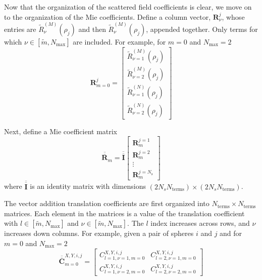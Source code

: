 Now that the organization of the scattered field coefficients is clear, we move on to the organization of the Mie coefficients. Define a column vector, $\boldsymbol{R}^{j}_{\nu}$, whose entries are $\widetilde{R}^{(M)}_{\nu}(\rho_{j})$ and then $\widetilde{R}^{(M)}_{\nu}(\rho_{j})$, appended together. Only terms for which $\nu \in [\widetilde{m}, N_{\mathrm{max}}]$ are included. For example, for $m=0$ and $N_{\mathrm{max}}=2$
\begin{equation}
\boldsymbol{R}^{j}_{m=0} = \left[ \begin{array}{c}
\widetilde{R}^{(M)}_{\nu=1}(\rho_{j}) \\
\widetilde{R}^{(M)}_{\nu=2}(\rho_{j}) \\ \hline
\widetilde{R}^{(N)}_{\nu=1}(\rho_{j}) \\
\widetilde{R}^{(N)}_{\nu=2}(\rho_{j})
\end{array}\right]
\end{equation}

Next, define a Mie coefficient matrix
\begin{equation}
\overline{\overline{\boldsymbol{R}}}_{m} =\overline{\overline{\boldsymbol{I}}} \left[ \begin{array}{c}
\boldsymbol{R}^{j=1}_{m} \\ \hline
\boldsymbol{R}^{j=2}_{m} \\ \hline
\vdots \\ \hline
\boldsymbol{R}^{j=N_{\mathrm{s}}}_{m}
\end{array}\right]
\end{equation}
%
where $\overline{\overline{\boldsymbol{I}}}$ is an identity matrix with dimensions $(2 N_{s} N_{\mathrm{terms}}) \times (2 N_{s} N_{\mathrm{terms}})$.

The vector addition translation coefficients are first organized into $N_{\mathrm{terms}} \times N_{\mathrm{terms}}$ matrices. Each element in the matrices is a value of the translation coefficient with $l \in [\widetilde{m}, N_{\mathrm{max}}]$ and $\nu \in [\widetilde{m}, N_{\mathrm{max}}]$. The $l$ index increases across rows, and $\nu$ increases down columns. For example, given a pair of spheres $i$ and $j$ and for $m=0$ and $N_{\mathrm{max}}=2$
%
\begin{equation}
\overline{\overline{\boldsymbol{C}}}_{m=0}^{X,Y,i,j} = \left[ \begin{array}{cc}
C_{l=1,\nu=1,m=0}^{X,Y,i,j} & C_{l=2,\nu=1,m=0}^{X,Y,i,j} \\
C_{l=1,\nu=2,m=0}^{X,Y,i,j} & C_{l=2,\nu=2,m=0}^{X,Y,i,j}
\end{array}\right]
\end{equation}

